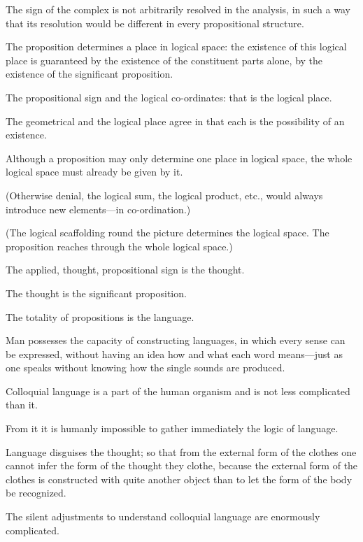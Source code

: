 {The sign of the complex is not arbitrarily
resolved in the analysis, in such a way that its
resolution would be different in every propositional
structure.}


{The proposition determines a place in logical
space: the existence of this logical place is guaranteed
by the existence of the constituent parts alone,
by the existence of the significant proposition.}


{The propositional sign and the logical co-ordinates:
that is the logical place.}


{The geometrical and the logical place agree in
that each is the possibility of an existence.}


{Although a proposition may only determine
one place in logical space, the whole logical space
must already be given by it.

(Otherwise denial, the logical sum, the logical
product, etc., would always introduce new elements---in
co-ordination.)

(The logical scaffolding round the picture determines
the logical space. The proposition reaches
through the whole logical space.)}


{The applied, thought, propositional sign is the
thought.}


{The thought is the significant proposition.}


{The totality of propositions is the language.}


{Man possesses the capacity of constructing
languages, in which every sense can be expressed,
without having an idea how and what each word
means---just as one speaks without knowing how
the single sounds are produced.

Colloquial language is a part of the human
organism and is not less complicated than it.

From it it is humanly impossible to gather
immediately the logic of language.

Language disguises the thought; so that from
the external form of the clothes one cannot infer
the form of the thought they clothe, because the
external form of the clothes is constructed with
quite another object than to let the form of the
body be recognized.

The silent adjustments to understand colloquial
language are enormously complicated.}


